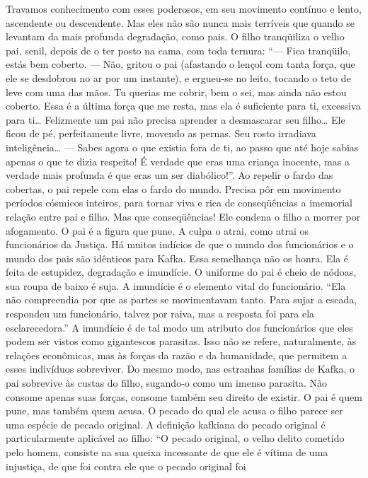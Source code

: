 Travamos conhecimento com esses poderosos, em seu movimento contínuo e
lento, ascendente ou descendente. Mas eles não são nunca mais terríveis
que quando se levantam da mais profunda degradação, como pais. O filho
tranqüiliza o velho pai, senil, depois de o ter posto na cama, com toda
ternura: ``--- Fica tranqüilo, estás bem coberto. --- Não, gritou o pai
(afastando o lençol com tanta força, que ele se desdobrou no ar por um
instante), e ergueu-se no leito, tocando o teto de leve com uma das
mãos. Tu querias me cobrir, bem o sei, mas ainda não estou coberto. Essa
é a última força que me resta, mas ela é suficiente para ti, excessiva
para ti\ldots{} Felizmente um pai não precisa aprender a desmascarar seu
filho\ldots{} Ele ficou de pé, perfeitamente livre, movendo as pernas. Seu
rosto irradiava inteligência\ldots{} --- Sabes agora o que existia fora de
ti, ao passo que até hoje sabias apenas o que te dizia respeito! É
verdade que eras uma criança inocente, mas a verdade mais profunda é que
eras um ser diabólico!''. Ao repelir o fardo das cobertas, o pai repele
com elas o fardo do mundo. Precisa pôr em movimento períodos cósmicos
inteiros, para tornar viva e rica de conseqüências a imemorial relação
entre pai e filho. Mas que conseqüências! Ele condena o filho a morrer
por afogamento. O pai é a figura que pune. A culpa o atrai, como atrai
os funcionários da Justiça. Há muitos indícios de que o mundo dos
funcionários e o mundo dos pais são idênticos para Kafka. Essa
semelhança não os honra. Ela é feita de estupidez, degradação e
imundície. O uniforme do pai é cheio de nódoas, sua roupa de baixo é
suja. A imundície é o elemento vital do funcionário. ``Ela não
compreendia por que as partes se movimentavam tanto. Para sujar a
escada, respondeu um funcionário, talvez por raiva, mas a resposta foi
para ela esclarecedora.'' A imundície é de tal modo um atributo dos
funcionários que eles podem ser vistos como gigantescos parasitas. Isso
não se refere, naturalmente, às relações econômicas, mas às forças da
razão e da humanidade, que permitem a esses indivíduos sobreviver. Do
mesmo modo, nas estranhas famílias de Kafka, o pai sobrevive às custas
do filho, sugando-o como um imenso parasita. Não consome apenas suas
forças, consome também seu direito de existir. O pai é quem pune, mas
também quem acusa. O pecado do qual ele acusa o filho parece ser uma
espécie de pecado original. A definição kafkiana do pecado original é
particularmente aplicável ao filho: ``O pecado original, o velho delito
cometido pelo homem, consiste na sua queixa incessante de que ele é
vítima de uma injustiça, de que foi contra ele que o pecado original foi
